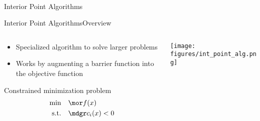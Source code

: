 
\begin{frame}{~}
    \begin{center}
        \LARGE{Interior Point Algorithms}
    \end{center}
\end{frame}{}

\begin{frame}{Interior Point Algorithms}{Overview \cite{vandenberghe2012convex}\cite{andersen2011interior}}
    \begin{columns}
        \begin{column}{0.5\textwidth}
            \begin{itemize}
                \item Specialized algorithm to solve larger problems
                \item Works by augmenting a barrier function into the objective function
            \end{itemize}
            \begin{definitionN}
            Constrained minimization problem
            \begin{align}
                \min \quad & {\mor f(x)} \\
                \text{s.t.} \quad & {\mdgr c_i(x) < 0}\nonumber
            \end{align}
            \end{definitionN}
        \end{column}
        \begin{column}{0.6\textwidth}
            \texttt{[image: figures/int\_point\_alg.png]}
        \end{column}
    \end{columns}
\end{frame}


